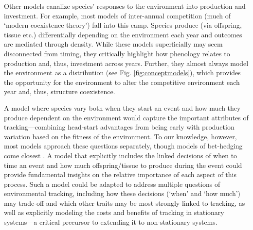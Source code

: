 \documentclass[11pt,letterpaper]{article}
\begin{document}
Other models canalize species' responses to the environment into production and investment. For example, most models of inter-annual competition (much of `modern coexistence theory') fall into this camp. Species produce (via offspring, tissue etc.) differentially depending on the environment each year and outcomes are mediated through density. While these models superficially may seem disconnected from timing, they critically highlight how phenology relates to production and, thus, investment across years. Further, they almost always model the environment as a distribution (see Fig. \ref{fig:conceptmodels}), which provides the opportunity for the environment to alter the competitive environment each year and, thus, structure coexistence. %

 A model where species vary both when they start an event and how much they produce dependent on the environment would capture the important attributes of tracking---combining head-start advantages from being early with production variation based on the fitness of the environment. To our knowledge, however, most models approach these questions separately, though models of bet-hedging come closest \citep{Gourbiere2009,tufto2015}. A model that explicitly includes the linked decisions of when to time an event and how much offspring/tissue to produce during the event could provide fundamental insights on the relative importance of each aspect of this process. Such a model could be adapted to address multiple questions of environmental tracking, including how these decisions (`when' and `how much') may trade-off and which other traits may be most strongly linked to tracking, as well as explicitly modeling the costs and benefits of tracking in stationary systems---a critical precursor to extending it to non-stationary systems. 
\end{document}
